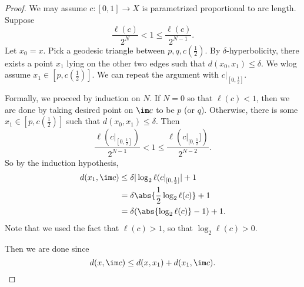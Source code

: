 \documentclass[a4paper]{article}
\begin{document}
\begin{proof}
  We may assume $c: [0, 1] \to X$ is parametrized proportional to arc length. Suppose
  \[
    \frac{\ell(c)}{2^N} < 1 \leq \frac{\ell(c)}{2^{N - 1}}.
  \]
  Let $x_0 = x$. Pick a geodesic triangle between $p, q, c(\frac{1}{2})$. By $\delta$-hyperbolicity, there exists a point $x_1$ lying on the other two edges such that $d(x_0, x_1) \leq \delta$. We wlog assume $x_1 \in [p, c(\frac{1}{2})]$. We can repeat the argument with $c|_{[0, \frac{1}{2}]}$.

  \begin{center}
  \end{center}

  Formally, we proceed by induction on $N$. If $N = 0$ so that $\ell(c) < 1$, then we are done by taking desired point on $\im c$ to be $p$ (or $q$). Otherwise, there is some $x_1 \in [p, c(\frac{1}{2})]$ such that $d(x_0, x_1) \leq \delta$. Then
  \[
    \frac{\ell(c|_{[0, \frac{1}{2}]})}{2^{N - 1}} < 1 \leq \frac{\ell(c|_{[0, \frac{1}2}])}{2^{N - 2}}.
  \]
  So by the induction hypothesis,
  \begin{align*}
    d(x_1, \im c) &\leq \delta |\log_2 \ell(c|_{[0, \frac{1}{2}]}| + 1\\
    &= \delta \abs{ \frac{1}{2}\log_2 \ell(c)} + 1\\
    &= \delta (\abs{\log_2 \ell(c)} - 1) + 1.
  \end{align*}
  Note that we used the fact that $\ell(c) > 1$, so that $\log_2 \ell(c) > 0$.

  Then we are done since
  \[
    d(x, \im c) \leq d(x, x_1) + d(x_1, \im c).
  \]
\end{proof}
\end{document}
